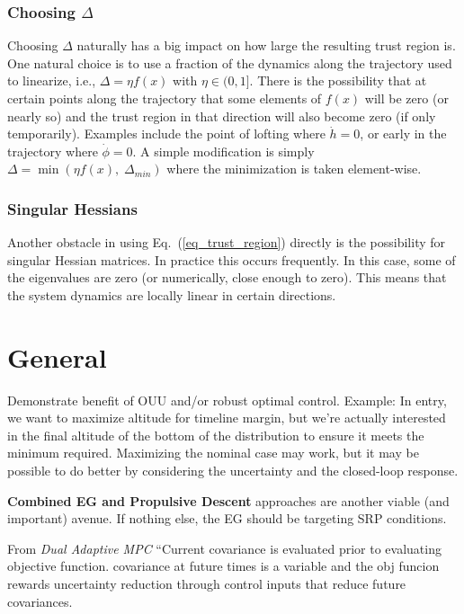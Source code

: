 \documentclass[10pt,a4paper]{article}
\begin{document}
	\subsubsection{Choosing $ \Delta $}
	Choosing $\Delta$ naturally has a big impact on how large the resulting trust region is. One natural choice is to use a fraction of the dynamics along the trajectory used to linearize, i.e., $\Delta = \eta f(x)$ with $\eta\in(0,1]$. There is the possibility that at certain points along the trajectory that some elements of $f(x)$ will be zero (or nearly so) and the trust region in that direction will also become zero (if only temporarily). Examples include the point of lofting where $\dot{h}=0$, or early in the trajectory where $\dot{\phi}=0$. A simple modification is simply $\Delta = \min(\eta f(x), \;\Delta_{min})$ where the minimization is taken element-wise.
	\subsubsection{Singular Hessians }
	Another obstacle in using Eq.~(\ref{eq_trust_region}) directly is the possibility for singular Hessian matrices. In practice this occurs frequently. In this case, some of the eigenvalues are zero (or numerically, close enough to zero). This means that the system dynamics are locally linear in certain directions.  


	
	\section{General}
	Demonstrate benefit of OUU and/or robust optimal control. 
	Example: In entry, we want to maximize altitude for timeline margin, but we're actually interested in the final altitude of the bottom of the distribution to ensure it meets the minimum required. Maximizing the nominal case may work, but it may be possible to do better by considering the uncertainty and the closed-loop response.
	
	\textbf{Combined EG and Propulsive Descent} approaches are another viable (and important) avenue. If nothing else, the EG should be targeting SRP conditions. 
	
	From \textit{Dual Adaptive MPC} ``Current covariance is evaluated prior to evaluating objective function. covariance at future times is a variable and the obj funcion rewards uncertainty reduction through control inputs that reduce future covariances. 
\end{document}
